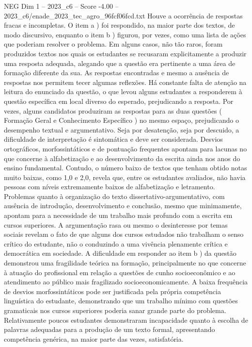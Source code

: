 \begin{textsample}{NEG Dim 1 – 2023\_c6 – Score -4.00 – 2023\_c6/enade\_2023\_tec\_agro\_96fcf06fcd.txt}
Houve a ocorrência de respostas fracas e incompletas.
O item a ) foi respondido, na maior parte dos textos, de modo discursivo, enquanto o item b ) figurou, por vezes, como uma lista de ações que poderiam resolver o problema.
Em alguns casos, não tão raros, foram produzidos textos nos quais os estudantes se recusaram explicitamente a produzir uma resposta adequada, alegando que a questão era pertinente a uma área de formação diferente da sua.
As respostas encontradas e mesmo a ausência de respostas nos permitem tecer algumas reflexões.
Há constante falta de atenção na leitura do enunciado da questão, o que levou alguns estudantes a responderem à questão específica em local diverso do esperado, prejudicando a resposta.
Por vezes, alguns candidatos produziram as respostas para as duas questões ( Formação Geral e Conhecimento Específico ) no mesmo espaço, prejudicando o desempenho textual e argumentativo.
Seja por desatenção, seja por descuido, a dificuldade de interpretação é sintomática e deve ser considerada.
Desvios ortográficos, morfossintáticos e de pontuação frequentes apontam para lacunas no que concerne à alfabetização e ao desenvolvimento da escrita ainda nos anos do ensino fundamental.
Contudo, o número baixo de textos que tenham obtido notas muito baixas, como 1,0 e 2,0, revela que, entre os estudantes avaliados, não havia pessoas com níveis extremamente baixos de alfabetização e letramento.
Problemas quanto à organização do texto dissertativo-argumentativo, com ausência de introdução, desenvolvimento e conclusão, mesmo que minimamente, apontam para a necessidade de um trabalho mais profundo com a escrita em cursos superiores.
A argumentação rasa ou mesmo o desinteresse por temas sociais revelam o fato de que alguns dos cursos estudados não trabalham o senso crítico do estudante, não o conduzindo a uma vivência plenamente crítica e democrática em sociedade.
A dificuldade em responder ao item b ) da questão demonstrou uma fragilidade teórica na formação, principalmente no que concerne à atuação do profissional em relação a questões de cunho socioeconômico e ao atendimento ao público mais fragilizado socioeconomicamente.
A baixa frequência de desvios morfossintáticos pode ser justificada pela própria competência linguística do estudante, demonstrando que um trabalho mínimo com questões gramaticais nos cursos superiores poderia sanar grande parte do problema.
Relativamente poucos estudantes demonstraram incapacidade quanto à escolha de palavras adequadas para a produção de um texto formal, apresentando competência genérica, na maior parte das vezes, satisfatória.

\end{textsample}
